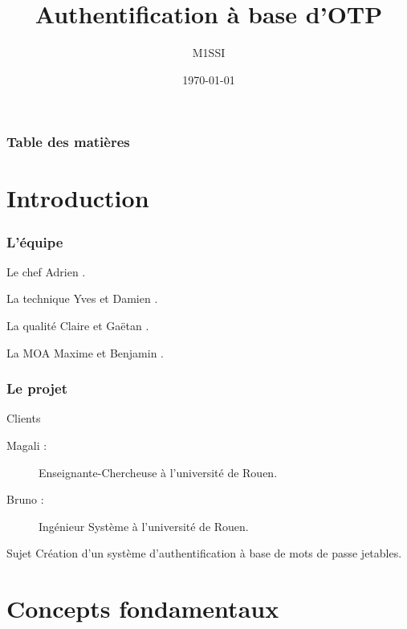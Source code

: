 \documentclass[xcolor=table]{beamer}
\title{Authentification \`{a} base d'OTP}
\author{M1SSI}
\institute[Université de Rouen] {
Université de Rouen \\
\medskip
}
\date{\today}
\begin{document}
\begin{frame}
\titlepage
\end{frame}

\begin{frame}
\frametitle{Table des matières}
\tableofcontents
\end{frame}

\section{Introduction}

\begin{frame}
\frametitle{L'équipe}
\begin{block}{Le chef}
Adrien .
\end{block}
\begin{block}{La technique}
Yves  et Damien .
\end{block}
\begin{block}{La qualité}
Claire  et Gaëtan .
\end{block}
\begin{block}{La MOA}
Maxime  et Benjamin .
\end{block}
\end{frame}


\begin{frame}
\frametitle{Le projet}

\begin{block}{Clients}
\begin{description}
\item[Magali :] Enseignante-Chercheuse à l'université de Rouen.\\
\item[Bruno :] Ingénieur Système à l'université de Rouen.
\end{description}
\end{block}

\begin{block}{Sujet}
Création d'un système d'authentification à base de mots de passe jetables.
\end{block}
\end{frame}




\section{Concepts fondamentaux}
\end{document}
